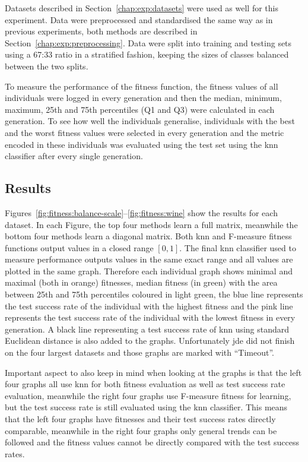 \documentclass[12pt,a4paper]{report}
\begin{document}
Datasets described in Section~\ref{chap:exp:datasets} were used as well for this experiment. Data were preprocessed and standardised the same way as in previous experiments, both methods are described in Section~\ref{chap:exp:preprocessing}. Data were split into training and testing sets using a 67:33 ratio in a stratified fashion, keeping the sizes of classes balanced between the two splits.

To measure the performance of the fitness function, the fitness values of all individuals were logged in every generation and then the median, minimum, maximum, 25th and 75th percentiles (Q1 and Q3) were calculated in each generation. To see how well the individuals generalise, individuals with the best and the worst fitness values were selected in every generation and the metric encoded in these individuals was evaluated using the test set using the \ac{knn} classifier after every single generation.

\subsection{Results}

Figures~\ref{fig:fitness:balance-scale}--\ref{fig:fitness:wine} show the results for each dataset. In each Figure, the top four methods learn a full matrix, meanwhile the bottom four methods learn a diagonal matrix. Both \ac{knn} and F-measure fitness functions output values in a closed range $[0,1]$. The final \ac{knn} classifier used to measure performance outputs values in the same exact range and all values are plotted in the same graph. Therefore each individual graph shows minimal and maximal (both in orange) fitnesses, median fitness (in green) with the area between 25th and 75th percentiles coloured in light green, the blue line represents the test success rate of the individual with the highest fitness and the pink line represents the test success rate of the individual with the lowest fitness in every generation. A black line representing a test success rate of \ac{knn} using standard Euclidean distance is also added to the graphs. Unfortunately \ac{jde} did not finish on the four largest datasets and those graphs are marked with ``Timeout''.

Important aspect to also keep in mind when looking at the graphs is that the left four graphs all use \ac{knn} for both fitness evaluation as well as test success rate evaluation, meanwhile the right four graphs use F-measure fitness for learning, but the test success rate is still evaluated using the \ac{knn} classifier. This means that the left four graphs have fitnesses and their test success rates directly comparable, meanwhile in the right four graphs only general trends can be followed and the fitness values cannot be directly compared with the test success rates.
\end{document}
